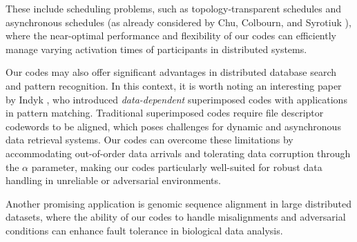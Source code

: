 \documentclass[11pt]{article}
\begin{document}
These include scheduling problems, such as topology-transparent schedules and asynchronous schedules
(as already considered by Chu, Colbourn, and Syrotiuk \cite{CCSb2006, CCSa2006}), 
where the near-optimal performance and flexibility of our codes can efficiently manage varying activation times 
of participants in distributed systems. 

Our codes may also offer significant advantages in distributed database search and pattern recognition.
In this context, it is worth noting an interesting paper by Indyk \cite{I1997}, who introduced  
\textit{data-dependent} superimposed codes with applications in pattern matching. 
Traditional superimposed codes require file descriptor codewords to 
be aligned, which poses challenges for dynamic and asynchronous data retrieval systems. 
Our codes can overcome these limitations by accommodating out-of-order data arrivals and tolerating 
data corruption through the $\alpha$ parameter, making our codes particularly well-suited 
for robust data handling in unreliable or adversarial environments.

Another promising application is genomic sequence alignment 
in large distributed datasets, where the ability of our codes to handle misalignments and adversarial 
conditions can enhance fault tolerance in biological data analysis.  

\fi
\end{document}
